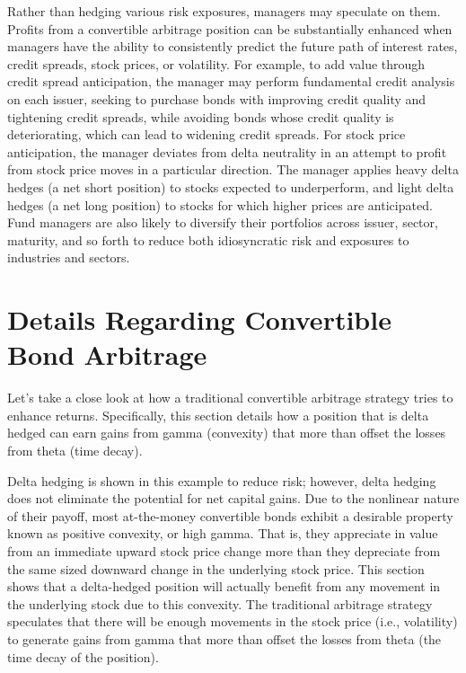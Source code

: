 \documentclass[11pt]{article}
\begin{document}
Rather than hedging various risk exposures, managers may speculate on them. Profits from a convertible arbitrage position can be substantially enhanced when managers have the ability to consistently predict the future path of interest rates, credit spreads, stock prices, or volatility. For example, to add value through credit spread anticipation, the manager may perform fundamental credit analysis on each issuer, seeking to purchase bonds with improving credit quality and tightening credit spreads, while avoiding bonds whose credit quality is deteriorating, which can lead to widening credit spreads. For stock price anticipation, the manager deviates from delta neutrality in an attempt to profit from stock price moves in a particular direction. The manager applies heavy delta hedges (a net short position) to stocks expected to underperform, and light delta hedges (a net long position) to stocks for which higher prices are anticipated. Fund managers are also likely to diversify their portfolios across issuer, sector, maturity, and so forth to reduce both idiosyncratic risk and exposures to industries and sectors.

\section*{Details Regarding Convertible Bond Arbitrage}
Let's take a close look at how a traditional convertible arbitrage strategy tries to enhance returns. Specifically, this section details how a position that is delta hedged can earn gains from gamma (convexity) that more than offset the losses from theta (time decay).

Delta hedging is shown in this example to reduce risk; however, delta hedging does not eliminate the potential for net capital gains. Due to the nonlinear nature of their payoff, most at-the-money convertible bonds exhibit a desirable property known as positive convexity, or high gamma. That is, they appreciate in value from an immediate upward stock price change more than they depreciate from the same sized downward change in the underlying stock price. This section shows that a delta-hedged position will actually benefit from any movement in the underlying stock due to this convexity. The traditional arbitrage strategy speculates that there will be enough movements in the stock price (i.e., volatility) to generate gains from gamma that more than offset the losses from theta (the time decay of the position).
\end{document}
